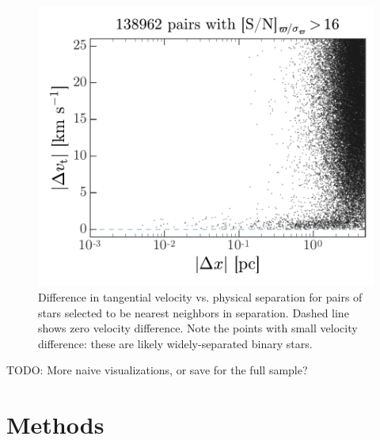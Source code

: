 \documentclass[manuscript, letterpaper]{aastex6}
\newcommand{\todo}[1]{{\color{red}TODO: #1}}
\begin{document}
\begin{figure}[p]
\begin{center}
\includegraphics[width=\textwidth]{figures/dv-sep.pdf}
\end{center}
\caption{%
Difference in tangential velocity vs. physical separation for pairs of stars
selected to be nearest neighbors in separation. Dashed line shows zero velocity
difference. Note the points with small velocity difference: these are likely
widely-separated binary stars.
\label{fig:dv-sep}}
\end{figure}

\todo{More naive visualizations, or save for the full sample?}

\section{Methods} \label{sec:methods}
\end{document}
